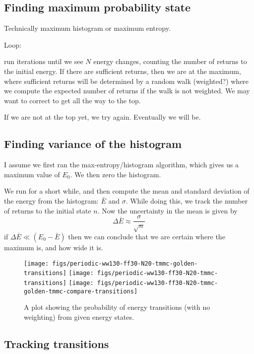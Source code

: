 \documentclass[letterpaper,twocolumn,amsmath,amssymb,pre,aps,10pt]{revtex4-1}
\begin{document}
\subsection{Finding maximum probability state}

Technically maximum histogram or maximum entropy.

Loop:

run iterations until we see $N$ energy changes, counting the number of
returns to the initial energy.  If there are sufficient returns, then
we are at the maximum, where sufficient returns will be determined by
a random walk (weighted?) where we compute the expected number of
returns if the walk is not weighted.  We may want to correct to get
all the way to the top.

If we are not at the top yet, we try again.  Eventually we will be.

\subsection{Finding variance of the histogram}

I assume we first ran the max-entropy/histogram algorithm, which gives
us a maximum value of $E_0$.  We then zero the histogram.

We run for a short while, and then compute the mean and standard
deviation of the energy from the histogram: $\bar E$ and $\sigma$.
While doing this, we track the number of returns to the initial state
$n$.  Now the uncertainty in the mean is given by
\begin{equation}
  \Delta \bar E \approx \frac{\sigma}{\sqrt{n}}
\end{equation}
if $\Delta \bar E \ll (E_0 - \bar E)$ then we can conclude that we are
certain where the maximum is, and how wide it is.

\begin{figure*}
  \texttt{[image: figs/periodic-ww130-ff30-N20-tmmc-golden-transitions]}\hfill%
\texttt{[image: figs/periodic-ww130-ff30-N20-tmmc-transitions]}\hfill%
\texttt{[image: figs/periodic-ww130-ff30-N20-tmmc-golden-tmmc-compare-transitions]}
  \caption{A plot showing the probability of energy transitions (with
    no weighting) from given energy states.\label{fig:transitions}}
\end{figure*}

\subsection{Tracking transitions}
\end{document}
